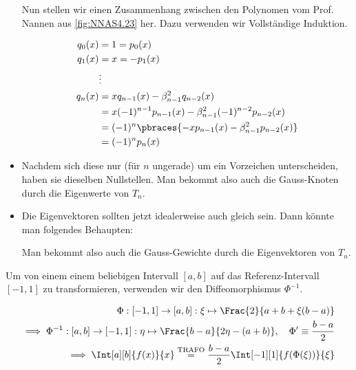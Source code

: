 \begin{solution}
\begin{itemize}
  Nun stellen wir einen Zusammenhang zwischen den Polynomen vom Prof. Nannen aus \ref{fig:NNAS4.23} her.
  Dazu verwenden wir Vollständige Induktion.

  \begin{align*}
    q_0(x) & = 1 = p_0(x) \\
    q_1(x) & = x = -p_1(x) \\
    & \vdots \\
    q_n(x)
    & =
    x q_{n-1}(x) - \beta_{n-1}^2 q_{n-2}(x) \\
    & =
    x (-1)^{n-1} p_{n-1}(x) - \beta_{n-1}^2 (-1)^{n-2} p_{n-2}(x) \\
    & =
    (-1)^n \pbraces
    {
      -x p_{n-1}(x) - \beta_{n-1}^2 p_{n-2}(x)
    } \\
    & =
    (-1)^n p_n(x)
  \end{align*}

  \item Nachdem sich diese nur (für $n$ ungerade) um ein Vorzeichen unterscheiden, haben sie dieselben Nullstellen.
  Man bekommt also auch die Gauss-Knoten durch die Eigenwerte von $T_n$.

  \item Die Eigenvektoren sollten jetzt idealerweise auch gleich sein.
  Dann könnte man folgendes Behaupten:

  Man bekommt also auch die Gauss-Gewichte durch die Eigenvektoren von $T_n$.

\end{itemize}

Um von einem einem beliebigen Intervall $[a, b]$ auf das Referenz-Intervall $[-1, 1]$ zu transformieren, verwenden wir den Diffeomorphismus $\Phi^{-1}$.

\begin{align*}
  \Phi:
  [-1, 1] \to [a, b]:
  \xi \mapsto \Frac{2}{a + b + \xi (b - a)} \\
  \implies
  \Phi^{-1}:
  [a, b] \to [-1, 1]:
  \eta \mapsto \Frac{b-a}{2 \eta - (a + b)},
  \quad
  \Phi^\prime \equiv \frac{b - a}{2} \\
  \implies
  \Int[a][b]{f(x)}{x}
  \stackrel{\text{TRAFO}}{=}
  \frac{b - a}{2}
  \Int[-1][1]{f(\Phi(\xi))}{\xi}
\end{align*}

\end{solution}

